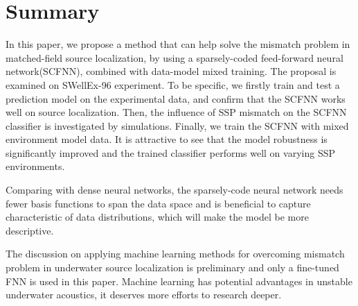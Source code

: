 \section{Summary}
In this paper, we propose a method that can help solve the mismatch problem in matched-field source localization,
by using a sparsely-coded feed-forward neural network(SCFNN), combined with data-model mixed training.
The proposal is examined on SWellEx-96 experiment.
To be specific, we firstly train and test a prediction model on the experimental data,
and confirm that the SCFNN works well on source localization.
Then, the influence of SSP mismatch on the SCFNN classifier is investigated by simulations. Finally, we train the SCFNN with mixed environment model data.
It is attractive to see that the model robustness is significantly improved and the trained classifier performs well on varying SSP environments.

Comparing with dense neural networks, the sparsely-code neural network needs fewer basis functions to span the data space and
is beneficial to capture characteristic of data distributions, which will make the model be more descriptive.

The discussion on applying machine learning methods for overcoming mismatch problem in underwater source localization is preliminary and only a fine-tuned FNN is used in this paper. Machine learning has potential advantages in unstable underwater acoustics, it deserves more efforts to research deeper.

